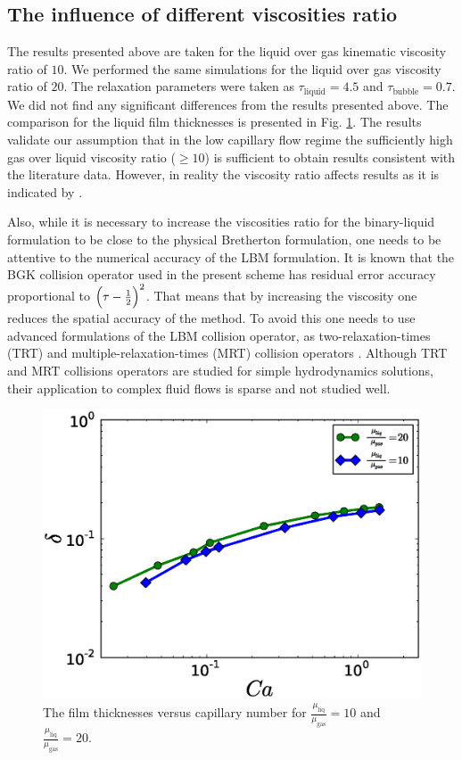 \documentclass[preprint,12pt]{elsarticle}
\begin{document}
\subsection{The influence of different viscosities ratio}
The results presented above are taken for the liquid over gas kinematic viscosity ratio of $10$.
We performed the same simulations for the liquid over gas viscosity ratio of $20$.
The relaxation parameters were taken as $\tau_{\mathrm{liquid}}=4.5$ and $\tau_{\mathrm{bubble}}=0.7$. We
did not find any significant differences from the results presented above. The
comparison for the liquid film thicknesses is presented in Fig.
\ref{fig:capillary:viscous}. The results validate our assumption that in
the low capillary flow regime the sufficiently high gas over liquid viscosity ratio ($\geq 10$)
is sufficient to obtain results
consistent with the literature data. 
{\color{red} However, in reality the viscosity ratio affects results as it
is indicated by \citet{shikazono-square}.}

{\color{red} Also, while it is necessary to increase the viscosities ratio for the binary-liquid
formulation to be close to the physical Bretherton formulation, one needs to be attentive to the
numerical accuracy of the LBM formulation. It is known \cite{ginzburg-trt-simple-hydro} that the
BGK collision operator used in the present scheme has residual error accuracy proportional
to $\Bigl(\tau-\frac{1}{2}\Bigr)^2$. That means that by increasing the viscosity one reduces the
spatial
accuracy of the method. To avoid this one needs to use advanced formulations of the LBM collision
operator, as two-relaxation-times (TRT) and multiple-relaxation-times (MRT) collision operators
\cite{ginzburg-main}. Although TRT and MRT collisions operators are studied for simple
hydrodynamics solutions, their application to complex fluid flows is sparse and not studied
well.
}
\begin{figure}
\includegraphics[width=\textwidth]{Figures/Capillary_Viscous/capillaries_viscous.eps}
\caption{The film thicknesses versus capillary number for
$\frac{\mu_{\mathrm{liq}}}{\mu_{\mathrm{gas}}}=10$ and $\frac{\mu_{\mathrm{liq}}}{\mu_{\mathrm{gas}}}=20$. \label{fig:capillary:viscous}}
\end{figure}
\end{document}
